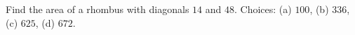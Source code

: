 Find the area of a rhombus with diagonals $14$ and $48$. Choices: (a) $100$, (b) $336$, (c) $625$, (d) $672$.
